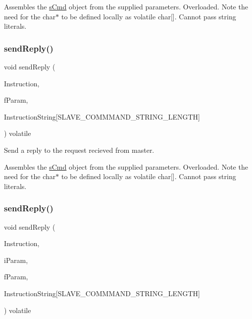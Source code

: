 Assembles the \mbox{\hyperlink{structs_cmd}{s\+Cmd}} object from the supplied parameters. Overloaded. Note the need for the char$\ast$ to be defined locally as volatile char\mbox{[}\mbox{]}. Cannot pass string literals. \mbox{\label{class_master_acca62a1478bc305cdd8496f684ea3f9d}} 
\subsubsection{\texorpdfstring{sendReply()}{sendReply()}\hspace{0.1cm}{\footnotesize\ttfamily [8/9]}}
{\footnotesize\ttfamily void send\+Reply (\begin{DoxyParamCaption}\item[{\mbox{\hyperlink{_s_p_i___instruction_set_8h_a949ec019a0f52780dcdd7d5a5ba73e47}{s\+Instruct}}}]{Instruction,  }\item[{float}]{f\+Param,  }\item[{volatile char}]{Instruction\+String\mbox{[}\+S\+L\+A\+V\+E\+\_\+\+C\+O\+M\+M\+M\+A\+N\+D\+\_\+\+S\+T\+R\+I\+N\+G\+\_\+\+L\+E\+N\+G\+T\+H\mbox{]} }\end{DoxyParamCaption}) volatile}



Send a reply to the request recieved from master. 

Assembles the \mbox{\hyperlink{structs_cmd}{s\+Cmd}} object from the supplied parameters. Overloaded. Note the need for the char$\ast$ to be defined locally as volatile char\mbox{[}\mbox{]}. Cannot pass string literals. \mbox{\label{class_master_a88fd38997e4ee0c26fd09a85477487fa}} 
\subsubsection{\texorpdfstring{sendReply()}{sendReply()}\hspace{0.1cm}{\footnotesize\ttfamily [9/9]}}
{\footnotesize\ttfamily void send\+Reply (\begin{DoxyParamCaption}\item[{\mbox{\hyperlink{_s_p_i___instruction_set_8h_a949ec019a0f52780dcdd7d5a5ba73e47}{s\+Instruct}}}]{Instruction,  }\item[{int}]{i\+Param,  }\item[{float}]{f\+Param,  }\item[{volatile char}]{Instruction\+String\mbox{[}\+S\+L\+A\+V\+E\+\_\+\+C\+O\+M\+M\+M\+A\+N\+D\+\_\+\+S\+T\+R\+I\+N\+G\+\_\+\+L\+E\+N\+G\+T\+H\mbox{]} }\end{DoxyParamCaption}) volatile}



